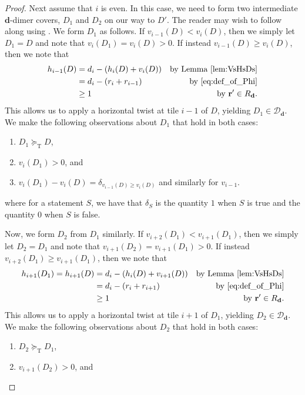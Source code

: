 \documentclass{amsart}
\def\bfd{{\mathbf{d}}}
\def\bfr{{\mathbf{r}}}
\theoremstyle{definition}
\newcommand{\geqt}{\succeq_{\text{T}}}
\begin{document}
\begin{proof}
Next assume that $i$ is even. In this case, we need to form two intermediate $\bfd$-dimer covers, $D_1$ and $D_2$ on our way to $D'$. The reader may wish to follow along using . We form $D_1$ as follows. If $v_{i-1}(D)<v_i(D)$, then we simply let $D_1=D$ and note that $v_i(D_1)=v_i(D)>0$. If instead $v_{i-1}(D)\geq v_i(D)$, then we note that \begin{align*}
    h_{i-1}(D)&=d_i-(h_i(D)+v_i(D)) & \text{by Lemma \ref{lem:VsHsDs}}\\
    &=d_i-(r_{i}+r_{i-1}) & \text{by \Cref{eq:def_of_Phi}}\\
    &\geq1 & \text{by $\bfr'\in R_\bfd$.}
\end{align*}
This allows us to apply a horizontal twist at tile $i-1$ of $D$, yielding $D_1\in\mathcal{D}_\bfd$. We make the following observations about $D_1$ that hold in both cases: \begin{enumerate}
    \item[(a1)] $D_1\geqt D$,
    \item[(b1)] $v_i(D_1)>0$, and
    \item[(c1)] $v_i(D_1)-v_i(D)=\delta_{v_{i-1}(D)\geq v_i(D)}$ and similarly for $v_{i-1}$.
\end{enumerate}
where for a statement $S$, we have that $\delta_S$
is the quantity $1$ when $S$ is true and the quantity
$0$ when $S$ is false.

Now, we form $D_2$ from $D_1$ similarly. If $v_{i+2}(D_1)<v_{i+1}(D_1)$, then we simply let $D_2=D_1$ and note that $v_{i+1}(D_2)=v_{i+1}(D_1)>0$. If instead $v_{i+2}(D_1)\geq v_{i+1}(D_1)$, then we note that
\begin{align*}
    h_{i+1}(D_1)=h_{i+1}(D)&=d_i-(h_i(D)+v_{i+1}(D)) & \text{by Lemma \ref{lem:VsHsDs}}\\
    &=d_i-(r_i+r_{i+1})& \text{by \Cref{eq:def_of_Phi}}\\
    &\geq 1 & \text{by $\bfr'\in R_\bfd$.}
\end{align*}
This allows us to apply a horizontal twist at tile $i+1$ of $D_1$, yielding $D_2\in\mathcal{D}_\bfd$. We make the
following observations about $D_2$ that hold in both cases:\begin{enumerate}
    \item[(a2)] $D_2\geqt D_1$,
    \item[(b2)] $v_{i+1}(D_2)>0$, and
\end{enumerate}


\end{proof}
\end{document}
